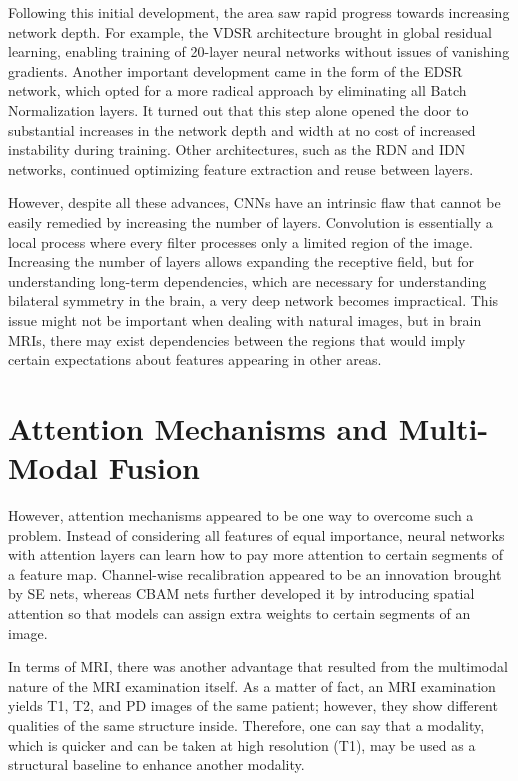 Following this initial development, the area saw rapid progress towards increasing network depth. For example, the VDSR architecture brought in global residual learning, enabling training of 20-layer neural networks without issues of vanishing gradients. Another important development came in the form of the EDSR network, which opted for a more radical approach by eliminating all Batch Normalization layers. It turned out that this step alone opened the door to substantial increases in the network depth and width at no cost of increased instability during training. Other architectures, such as the RDN and IDN networks, continued optimizing feature extraction and reuse between layers.

However, despite all these advances, CNNs have an intrinsic flaw that cannot be easily remedied by increasing the number of layers. Convolution is essentially a local process where every filter processes only a limited region of the image. Increasing the number of layers allows expanding the receptive field, but for understanding long-term dependencies, which are necessary for understanding bilateral symmetry in the brain, a very deep network becomes impractical. This issue might not be important when dealing with natural images, but in brain MRIs, there may exist dependencies between the regions that would imply certain expectations about features appearing in other areas.

\section{Attention Mechanisms and Multi-Modal Fusion}
However, attention mechanisms appeared to be one way to overcome such a problem. Instead of considering all features of equal importance, neural networks with attention layers can learn how to pay more attention to certain segments of a feature map. Channel-wise recalibration appeared to be an innovation brought by SE nets, whereas CBAM nets further developed it by introducing spatial attention so that models can assign extra weights to certain segments of an image.

In terms of MRI, there was another advantage that resulted from the multimodal nature of the MRI examination itself. As a matter of fact, an MRI examination yields T1, T2, and PD images of the same patient; however, they show different qualities of the same structure inside. Therefore, one can say that a modality, which is quicker and can be taken at high resolution (T1), may be used as a structural baseline to enhance another modality.


